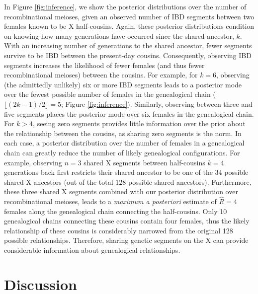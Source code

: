 \documentclass[11pt]{article}
\begin{document}
In Figure \ref{fig:inference}, we show the posterior distributions over the
number of recombinational meioses, given an observed number of IBD segments
between two females known to be X half-cousins. Again, these posterior
distributions condition on knowing how many generations have occurred since the
shared ancestor, $k$.  With an increasing number of generations to the shared
ancestor, fewer segments survive to be IBD between the present-day cousins.
Consequently, observing IBD segments increases the likelihood of fewer females
(and thus fewer recombinational meioses) between the cousins. For example, for
$k=6$, observing (the admittedly unlikely) six or more IBD segments leads to a
posterior mode over the fewest possible number of females in the genealogical
chain ($\lfloor (2k-1)/2 \rfloor = 5$; Figure \ref{fig:inference}).  Similarly,
observing between three and five segments places the posterior mode over six
females in the genealogical chain. For $k>4$, seeing zero segments provides
little information over the prior about the relationship between the cousins,
as sharing zero segments is the norm. In each case, a posterior distribution
over the number of females in a genealogical chain can greatly reduce the
number of likely genealogical configurations. For example, observing $n=3$
shared X segments between half-cousins $k=4$ generations back first restricts
their shared ancestor to be one of the $34$ possible shared X ancestors (out of
the total $128$ possible shared ancestors). Furthermore, these three shared X
segments combined with our posterior distribution over recombinational meioses,
leads to a \emph{maximum a posteriori} estimate of $\hat{R} = 4$ females along
the genealogical chain connecting the half-cousins. Only 10 genealogical chains
connecting these cousins contain four females, thus the likely relationship of
these cousins is considerably narrowed from the original 128 possible
relationships. Therefore, sharing genetic segments on the X can provide
considerable information about genealogical relationships.

\section{Discussion}
\end{document}
